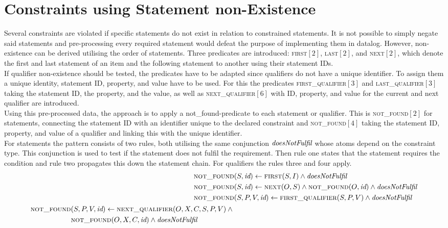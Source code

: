 \documentclass[hyperref,bachelorofscience,fleqn]{cgvpub}
\begin{document}
\section{Constraints using Statement non-Existence}\label{sec_constraints_using_statement_non}
Several constraints are violated if specific statements do not exist in relation to constrained statements. It is not possible to simply negate said statements and pre-processing every required statement would defeat the purpose of implementing them in datalog. However, non-existence can be derived utilising the order of statements. Three predicates are introduced: \textsc{first}\([2]\), \textsc{last}\([2]\), and \textsc{next}\([2]\), which denote the first and last statement of an item and the following statement to another using their statement IDs.\\

If qualifier non-existence should be tested, the predicates have to be adapted since qualifiers do not have a unique identifier. To assign them a unique identity, statement ID, property, and value have to be used. For this the predicates \textsc{first\_qualifier}\([3]\) and \textsc{last\_qualifier}\([3]\) taking the statement ID, the property, and the value, as well as \textsc{next\_qualifier}\([6]\) with ID, property, and value for the current and next qualifier are introduced.\\

Using this pre-processed data, the approach is to apply a not\_found-predicate to each statement or qualifier. This is \textsc{not\_found}\([2]\) for statements, connecting the statement ID with an identifier unique to the declared constraint and \textsc{not\_found}\([4]\) taking the statement ID, property, and value of a qualifier and linking this with the unique identifier.\\

For statements the pattern consists of two rules, both utilising the same conjunction \(\emph{doesNotFulfil}\) whose atoms depend on the constraint type. This conjunction is used to test if the statement does not fulfil the requirement. Then rule one states that the statement requires the condition and rule two propagates this down the statement chain. For qualifiers the rules three and four apply.
\begin{align}
\textsc{not\_found}&(S, \emph{id}) \leftarrow \textsc{first}(S, I) \wedge \emph{doesNotFulfil} \\
\textsc{not\_found}&(S, \emph{id}) \leftarrow \textsc{next}(O, S) \wedge \textsc{not\_found}(O, \emph{id}) \wedge \emph{doesNotFulfil} \\
\textsc{not\_found}&(S, P, V, \emph{id}) \leftarrow \textsc{first\_qualifier}(S, P, V) \wedge \emph{doesNotFulfil} \\
\begin{split}
\textsc{not\_found}&(S, P, V, \emph{id}) \leftarrow \textsc{next\_qualifier}(O, X, C, S, P, V) \wedge{} \\
&\textsc{not\_found}(O, X, C, \emph{id}) \wedge \emph{doesNotFulfil}
\end{split}
\end{align}
\end{document}
